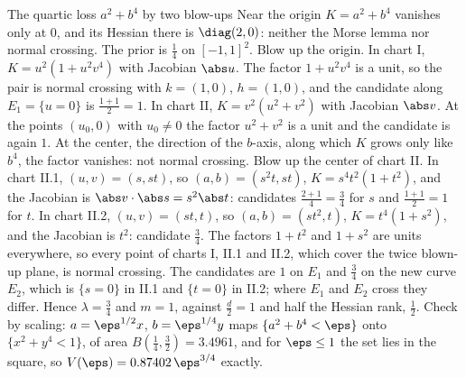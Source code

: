 \begin{refsection}
\begin{computation}{The quartic loss $a^2+b^4$ by two blow-ups}\label{comp:blowups:quartic}
\step Near the origin $K=a^2+b^4$ vanishes only at $0$, and its Hessian there is $\diag(2,0)$: neither the Morse lemma nor normal crossing. The prior is $\frac14$ on $[-1,1]^2$.
\step Blow up the origin. In chart I, $K=u^2(1+u^2v^4)$ with Jacobian $\abs u$. The factor $1+u^2v^4$ is a unit, so the pair is normal crossing with $k=(1,0)$, $h=(1,0)$, and the candidate along $E_1=\{u=0\}$ is $\frac{1+1}{2}=1$.
\step In chart II, $K=v^2(u^2+v^2)$ with Jacobian $\abs v$. At the points $(u_0,0)$ with $u_0\ne0$ the factor $u^2+v^2$ is a unit and the candidate is again $1$. At the center, the direction of the $b$-axis, along which $K$ grows only like $b^4$, the factor vanishes: not normal crossing.
\step Blow up the center of chart II. In chart II.1, $(u,v)=(s,st)$, so $(a,b)=(s^2t,st)$, $K=s^4t^2(1+t^2)$, and the Jacobian is $\abs v\cdot\abs s=s^2\abs t$: candidates $\frac{2+1}{4}=\frac34$ for $s$ and $\frac{1+1}2=1$ for $t$. In chart II.2, $(u,v)=(st,t)$, so $(a,b)=(st^2,t)$, $K=t^4(1+s^2)$, and the Jacobian is $t^2$: candidate $\frac34$.
\step The factors $1+t^2$ and $1+s^2$ are units everywhere, so every point of charts I, II.1 and II.2, which cover the twice blown-up plane, is normal crossing. The candidates are $1$ on $E_1$ and $\frac34$ on the new curve $E_2$, which is $\{s=0\}$ in II.1 and $\{t=0\}$ in II.2; where $E_1$ and $E_2$ cross they differ. Hence $\lambda=\frac34$ and $m=1$, against $\frac d2=1$ and half the Hessian rank, $\frac12$.
\step Check by scaling: $a=\eps^{1/2}x$, $b=\eps^{1/4}y$ maps $\{a^2+b^4<\eps\}$ onto $\{x^2+y^4<1\}$, of area $B(\frac14,\frac32)=3.4961$, and for $\eps\le1$ the set lies in the square, so $V(\eps)=0.87402\,\eps^{3/4}$ exactly.
\end{computation}


\end{refsection}
